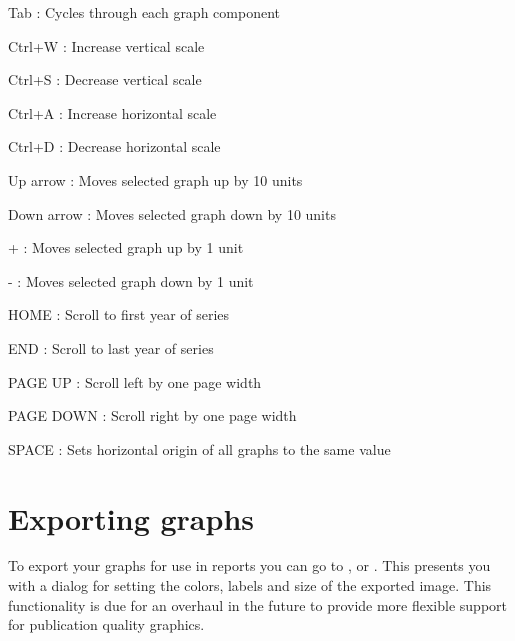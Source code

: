 \begin{description*}
 \item[Tab] : Cycles through each graph component
 \item[Ctrl+W] : Increase vertical scale
 \item[Ctrl+S] : Decrease vertical scale
 \item[Ctrl+A] : Increase horizontal scale
 \item[Ctrl+D] : Decrease horizontal scale
 \item[Up arrow] : Moves selected graph up by 10 units
 \item[Down arrow] : Moves selected graph down by 10 units
 \item[+] : Moves selected graph up by 1 unit
 \item[-] : Moves selected graph down by 1 unit
 \item[HOME] : Scroll to first year of series
 \item[END] : Scroll to last year of series
 \item[PAGE UP] : Scroll left by one page width
 \item[PAGE DOWN] : Scroll right by one page width
 \item[SPACE] : Sets horizontal origin of all graphs to the same value 
\end{description*}

\section{Exporting graphs}
To export your graphs for use in reports you can go to , or .  This presents you with a dialog for setting the colors, labels and size of the exported image.  This functionality is due for an overhaul in the future to provide more flexible support for publication quality graphics.  
